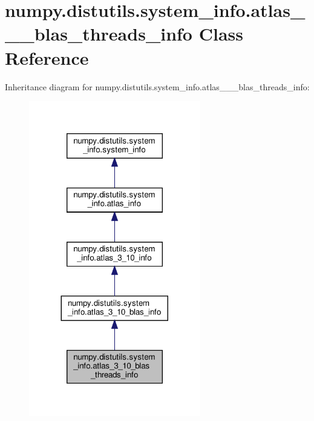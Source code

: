 \hypertarget{classnumpy_1_1distutils_1_1system__info_1_1atlas__3__10__blas__threads__info}{}\section{numpy.\+distutils.\+system\+\_\+info.\+atlas\+\_\+\_\+\_\+blas\+\_\+threads\+\_\+info Class Reference}
\label{classnumpy_1_1distutils_1_1system__info_1_1atlas__3__10__blas__threads__info}


Inheritance diagram for numpy.\+distutils.\+system\+\_\+info.\+atlas\+\_\+\_\+\_\+blas\+\_\+threads\+\_\+info\+:
\nopagebreak
\begin{figure}[H]
\begin{center}
\leavevmode
\includegraphics[width=212pt]{classnumpy_1_1distutils_1_1system__info_1_1atlas__3__10__blas__threads__info__inherit__graph}
\end{center}
\end{figure}


